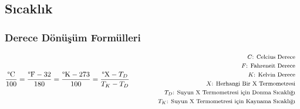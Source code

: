 \subsection{Sıcaklık}

\subsubsection*{Derece Dönüşüm Formülleri}
\begin{equation}
    \frac{\text{\textdegree C}}{100} = \frac{\text{\textdegree F} - 32}{180} = \frac{\text{\textdegree K} - 273}{100} = \frac{\text{\textdegree X} - T_D}{T_K - T_D} \qquad \qquad \parbox{7cm}{\footnotesize$\begin{aligned}
        C\text{: Celcius Derece } \\
        F\text{: Fahreneit Derece } \\
        K\text{: Kelvin Derece } \\
        X\text{: Herhangi Bir X Termometresi } \\
        T_D\text{: Suyun X Termometresi için Donma Sıcaklığı } \\
        T_K\text{: Suyun X Termometresi için Kaynama Sıcaklığı }
\end{aligned}$}
\end{equation}
